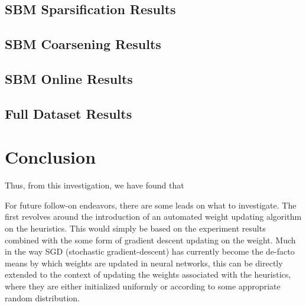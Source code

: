 \documentclass{article}
\begin{document}
\subsection{SBM Sparsification Results}

\subsection{SBM Coarsening Results}

\subsection{SBM Online Results}

\subsection{Full Dataset Results}

\section{Conclusion}\label{conclusion}
Thus, from this investigation, we have found that 

For future follow-on endeavors, there are some leads on what to investigate. The first revolves around the introduction of an automated weight updating algorithm on the heuristics. This would simply be based on the experiment results combined with the some form of gradient descent updating on the weight. Much in the way SGD (stochastic gradient-descent) has currently become the de-facto means by which weights are updated in neural networks, this can be directly extended to the context of updating the weights associated with the heuristics, where they are either initialized uniformly or according to some appropriate random distribution.
\end{document}
